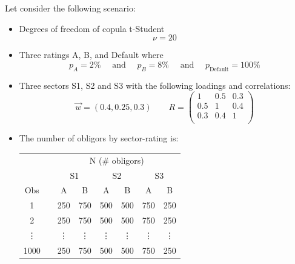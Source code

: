 \documentclass[11pt,fleqn]{book} %
\begin{document}
\begin{example}[1000 observations]
	\label{ex:calib}
	Let consider the following scenario:
	\begin{itemize}
		\item Degrees of freedom of copula t-Student
		\begin{displaymath}
			\nu=20
		\end{displaymath}
		\item Three ratings A, B, and Default where
		\begin{displaymath}
			p_A=2\% \quad \text{ and } \quad 
			p_B=8\% \quad \text{ and } \quad 
			p_{\text{Default}}=100\%
		\end{displaymath}
		\item Three sectors S1, S2 and S3 with the following loadings and correlations:
		\begin{displaymath}
			\vec{w} = (0.4, 0.25, 0.3)
			\qquad 
			R = \left(
			\begin{array}{ccc}
				1 & 0.5 & 0.3 \\
				0.5 & 1 & 0.4 \\
				0.3 & 0.4 & 1 \\
			\end{array}
			\right) 
		\end{displaymath}
		\item The number of obligors by sector-rating is:\\
		\newline
		\small
		\begin{tabular}{cc|c|c||c|c||c|c|}
			\cline{3-8}
			& & \multicolumn{6}{|c|}{N (\# obligors)} \\
			\cline{3-8}
			& & \multicolumn{2}{|c||}{S1} & \multicolumn{2}{|c||}{S2} & \multicolumn{2}{|c|}{S3} \\
			\cline{1-1} \cline{3-8}
			\multicolumn{1}{|c|}{Obs} & & A & B & A & B & A & B \\
			\cline{1-1} \cline{3-8}
			\multicolumn{1}{|c|}{1} & & 250 & 750 & 500 & 500 & 750 & 250 \\
			\cline{1-1} \cline{3-8}
			\multicolumn{1}{|c|}{2} & & 250 & 750 & 500 & 500 & 750 & 250 \\
			\cline{1-1} \cline{3-8}
			\multicolumn{1}{|c|}{\vdots} & & \vdots & \vdots & \vdots & \vdots & \vdots & \vdots \\
			\cline{1-1} \cline{3-8}
			\multicolumn{1}{|c|}{1000} & & 250 & 750 & 500 & 500 & 750 & 250 \\
			\cline{1-1} \cline{3-8}
		\end{tabular}
	\end{itemize}


\end{example}
\end{document}
